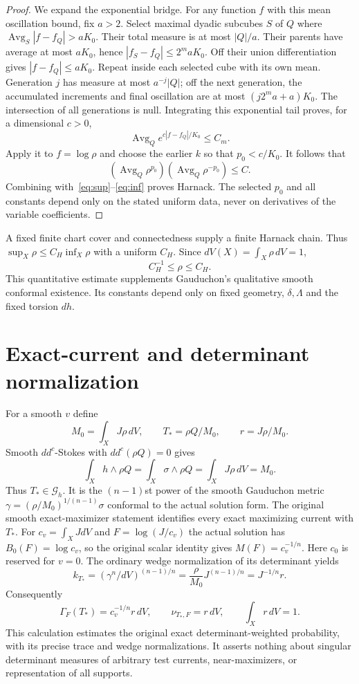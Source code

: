 \documentclass[11pt]{article}
\theoremstyle{remark}\newtheorem{remark}[theorem]{Remark}
\newcommand{\ddc}{dd^c}
\newcommand{\avg}{\mathop{\mathrm{Avg}}}
\begin{document}
\begin{proof}
We expand the exponential bridge. For any function $f$ with this
mean oscillation bound, fix $a>2$. Select maximal dyadic subcubes
$S$ of $Q$ where $\avg_S|f-f_Q|>aK_0$.
Their total measure is at most $|Q|/a$.
Their parents have average at most $aK_0$, hence
$|f_S-f_Q|\leq2^maK_0$.
Off their union differentiation gives $|f-f_Q|\leq aK_0$.
Repeat inside each selected cube with its own mean. Generation
$j$ has measure at most $a^{-j}|Q|$; off the next generation,
the accumulated increments and final oscillation are at most
$(j2^ma+a)K_0$. The intersection of all generations is null.
Integrating this exponential tail proves, for a dimensional $c>0$,
\[
 \avg_Q e^{c|f-f_Q|/K_0}\leq C_m.
\]
Apply it to $f=\log\rho$ and choose the earlier $k$ so that
$p_0<c/K_0$. It follows that
\[
 (\avg_Q\rho^{p_0})(\avg_Q\rho^{-p_0})\leq C.
\]
Combining with~\eqref{eq:sup}--\eqref{eq:inf} proves Harnack.
The selected $p_0$ and all constants depend only on the stated
uniform data, never on derivatives of the variable coefficients.
\end{proof}

A fixed finite chart cover and connectedness supply a finite
Harnack chain. Thus $\sup_X\rho\leq C_H\inf_X\rho$ with a
uniform $C_H$. Since $dV(X)=\int_X\rho\,dV=1$,
\begin{equation}\label{eq:rho}
 C_H^{-1}\leq\rho\leq C_H.
\end{equation}
This quantitative estimate supplements Gauduchon's qualitative
smooth conformal existence. Its constants depend only on fixed
geometry, $\delta,\Lambda$ and the fixed torsion $dh$.

\section{Exact-current and determinant normalization}
For a smooth $v$ define
\[
 M_0=\int_XJ\rho\,dV,\qquad
 T_* =\rho Q/M_0,\qquad r=J\rho/M_0.
\]
Smooth $\ddc$-Stokes with $\ddc(\rho Q)=0$ gives
\[
 \int_Xh\wedge\rho Q
  =\int_X\sigma\wedge\rho Q
  =\int_XJ\rho\,dV=M_0.
\]
Thus $T_*\in\mathcal G_h$. It is the $(n-1)$st power of the
smooth Gauduchon metric
$\gamma=(\rho/M_0)^{1/(n-1)}\sigma$ conformal to the actual
solution form. The original smooth exact-maximizer statement
identifies every exact maximizing current with $T_*$.
For $c_v=\int_XJdV$ and $F=\log(J/c_v)$ the actual solution has
$B_0(F)=\log c_v$, so the original scalar identity gives
$M(F)=c_v^{-1/n}$. Here $c_0$ is reserved for $v=0$.
The ordinary wedge normalization of its determinant yields
\[
 k_{T_*}=(\gamma^n/dV)^{(n-1)/n}
       =\frac{\rho}{M_0}J^{(n-1)/n}
       =J^{-1/n}r.
\]
Consequently
\[
 \Gamma_F(T_*)=c_v^{-1/n}r\,dV,
 \qquad \nu_{T_*,F}=r\,dV,\qquad\int_Xr\,dV=1.
\]
This calculation estimates the original exact determinant-weighted
probability, with its precise trace and wedge normalizations.
It asserts nothing about singular determinant measures of arbitrary
test currents, near-maximizers, or representation of all supports.
\end{document}
